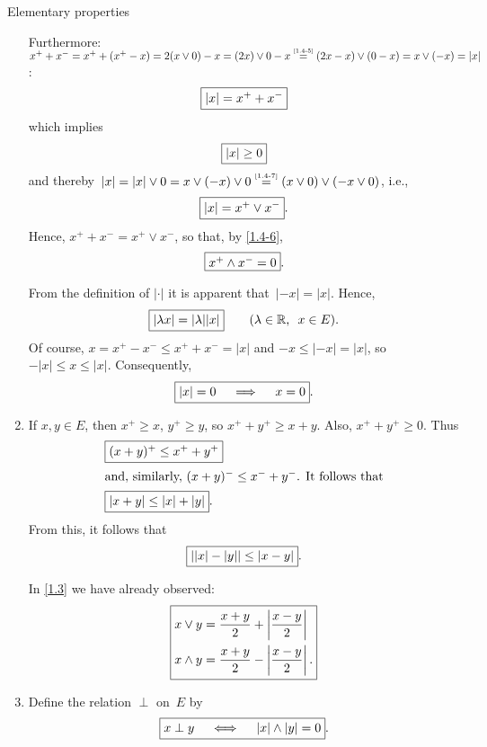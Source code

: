 \documentclass[main.tex]{subfiles}
\begin{document}
\begin{psec}{Elementary properties}
\begin{enumerate}
Furthermore:
$x^+ + x^- 
= x^+ + (x^+ - x) 
= 2(x\vee 0) -x
= (2x)\vee 0 -x
\isref{1.4-5} (2x-x)\vee(0-x) = x\vee(-x) = |x|$:
\begin{equation*}
\fbox{$ |x| = x^+ + x^- $}
\end{equation*}
which implies
\begin{equation*}
\fbox{$ |x|\ge 0 $}
\end{equation*}
and 
thereby~$|x|=|x|\vee 0
= x\vee(-x)\vee 0 \isref{1.4-7} (x\vee 0) \vee (-x\vee 0)$,
i.e., 
\begin{equation*}
\fbox{$ |x| = x^+ \vee x^- $}
\text{.}
\end{equation*}
Hence, $x^+ + x^- = x^+ \vee x^-$,
so that, 
by \ref{1.4-6},
\begin{equation*}
\fbox{$ x^+ \wedge x^- = 0 $} 
\text{.}
\end{equation*}

From the definition of $|\cdot|$
it is apparent that~$|-x|=|x|$.
Hence, 
\begin{equation*}
\fbox{$ |\lambda x|=|\lambda| |x| $} 
  \qquad (\lambda\in\mathbb{R}\text{, }\ x\in E)\text{.}
\end{equation*}
Of course,
$x=x^+ - x^-\leq x^+ + x^- = |x|$
and $-x\leq|-x|=|x|$,
so $-|x|\leq x \leq |x|$.
Consequently,
\begin{equation*}
\fbox{$ |x|=0 \quad \implies \quad x=0 $}
\text{.}
\end{equation*}
%
\item%
\label{1.4-10}
If $x,y\in E$,
then $x^+\geq x$, 
$y^+\geq y$,
so $x^+ + y^+ \geq x+y$.
Also,
$x^+ + y^+\geq 0$.
Thus
\begin{align*}
&\fbox{$ (x+y)^+ \leq x^+ + y^+ $}\\
\intertext{and, 
similarly, 
$(x+y)^- \leq x^- + y^-$.
It follows that}
&\fbox{$ |x+y|\leq|x|+|y| $}
\text{.}
\end{align*}
From this,
it follows that
\begin{equation*}
\fbox{$ ||x|-|y|| \leq |x-y| $}
\text{.}
\end{equation*}

In \ref{1.3} 
we have already observed:
\[ \fbox{$ 
\begin{aligned}
x \vee y 
  &= \frac{x+y}{2} + \left | \frac{x-y}{2} \right | \\
x \wedge y 
  &= \frac{x+y}{2} - \left | \frac{x-y}{2} \right | 
\text{.}
\end{aligned}  $} \]
%
\item
\label{1.4-11}
Define the relation $\perp$ on~$E$ by
\begin{equation*}
\fbox{$ x \perp y \quad \iff \quad |x|\wedge|y|=0 $}
\text{.}
\end{equation*}


\end{enumerate}
\end{psec}
\end{document}

